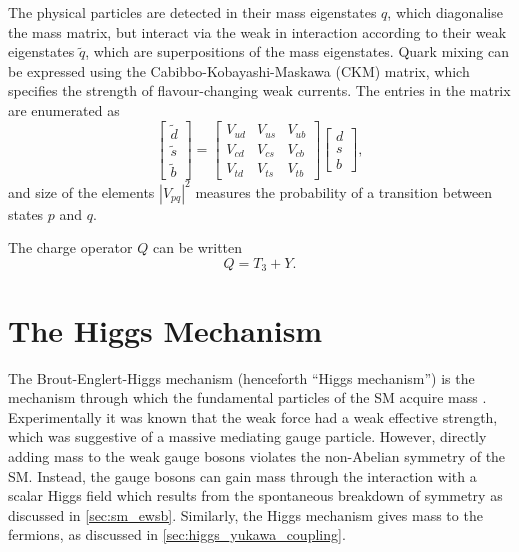 The physical particles are detected in their mass eigenstates $q$, which diagonalise the mass matrix, but interact via the weak in interaction according to their weak eigenstates $\tilde{q}$, which are superpositions of the mass eigenstates.
Quark mixing can be expressed using the Cabibbo-Kobayashi-Maskawa (CKM) matrix, which specifies the strength of flavour-changing weak currents.
The entries in the matrix are enumerated as
%
\begin{equation}
    \begin{bmatrix}
        \tilde{d} \\ \tilde{s} \\ \tilde{b} 
    \end{bmatrix}
    = \begin{bmatrix}
        V_{ud} & V_{us} & V_{ub} \\  
        V_{cd} & V_{cs} & V_{cb} \\  
        V_{td} & V_{ts} & V_{tb} 
    \end{bmatrix}
    \begin{bmatrix}
        {d} \\ {s} \\ {b} 
    \end{bmatrix} ,
\end{equation}
%
and size of the elements $|V_{pq}|^2$ measures the probability of a transition between states $p$ and $q$.


The charge operator $Q$ can be written 
%
\begin{equation}\label{eq:charge_operator}
  Q = T_3 + Y .
\end{equation}
%



\section{The Higgs Mechanism}\label{sec:sm_higgs}

The Brout-Englert-Higgs mechanism (henceforth ``Higgs mechanism'') is the mechanism through which the fundamental particles of the SM acquire mass \cite{Englert:1964et,Higgs:1964pj,Guralnik:1964eu}.
Experimentally it was known that the weak force had a weak effective strength, which was suggestive of a massive mediating gauge particle.
However, directly adding mass to the weak gauge bosons violates the non-Abelian symmetry of the SM.
Instead, the gauge bosons can gain mass through the interaction with a scalar Higgs field which results from the spontaneous breakdown of symmetry as discussed in \cref{sec:sm_ewsb}.
Similarly, the Higgs mechanism gives mass to the fermions, as discussed in \cref{sec:higgs_yukawa_coupling}.


